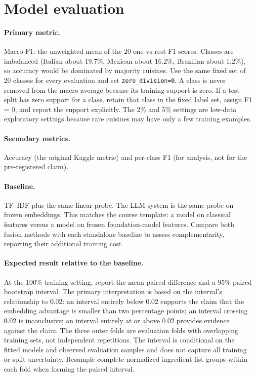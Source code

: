 ﻿\documentclass[11pt,letterpaper]{article}
\begin{document}
\section{Model evaluation}

\paragraph{Primary metric.}
Macro-F1: the unweighted mean of the 20 one-vs-rest F1 scores. Classes are imbalanced (Italian about 19.7\%, Mexican about 16.2\%, Brazilian about 1.2\%), so accuracy would be dominated by majority cuisines. Use the same fixed set of 20 classes for every evaluation and set \texttt{zero\_division=0}. A class is never removed from the macro average because its training support is zero. If a test split has zero support for a class, retain that class in the fixed label set, assign F1 = 0, and report the support explicitly. The 2\% and 5\% settings are low-data exploratory settings because rare cuisines may have only a few training examples.

\paragraph{Secondary metrics.}
Accuracy (the original Kaggle metric) and per-class F1 (for analysis, not for the pre-registered claim).

\paragraph{Baseline.}
TF--IDF plus the same linear probe. The LLM system is the same probe on frozen embeddings. This matches the course template: a model on classical features versus a model on frozen foundation-model features. Compare both fusion methods with each standalone baseline to assess complementarity, reporting their additional training cost.

\paragraph{Expected result relative to the baseline.}
At the 100\% training setting, report the mean paired difference and a 95\% paired bootstrap interval. The primary interpretation is based on the interval's relationship to 0.02: an interval entirely below 0.02 supports the claim that the embedding advantage is smaller than two percentage points; an interval crossing 0.02 is inconclusive; an interval entirely at or above 0.02 provides evidence against the claim. The three outer folds are evaluation folds with overlapping training sets, not independent repetitions. The interval is conditional on the fitted models and observed evaluation samples and does not capture all training or split uncertainty. Resample complete normalized ingredient-list groups within each fold when forming the paired interval.
\end{document}
